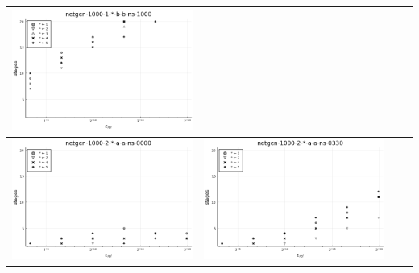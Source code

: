 \documentclass{article}
\begin{document}
\begin{landscape}
\begin{center}
\begin{longtable}{| c | c | c | c |}
\includegraphics[height=0.22\textheight]{hiter_fixlim_netgen-1000-1-_-b-b-ns-1000.png} \\
                \hline
\includegraphics[height=0.22\textheight]{hiter_fixlim_netgen-1000-2-_-a-a-ns-0000.png} &
\includegraphics[height=0.22\textheight]{hiter_fixlim_netgen-1000-2-_-a-a-ns-0330.png} &

\end{longtable}
\end{center}
\end{landscape}
\end{document}
